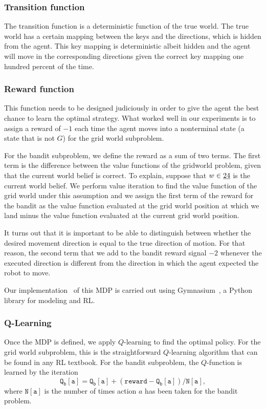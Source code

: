 \subsubsection{Transition function}
%
The transition function is a deterministic function of the true world. The true 
world has a certain mapping between the keys and the directions, which is hidden
from the agent. This key mapping is deterministic albeit hidden and the agent
will move in the corresponding directions given the correct key mapping one
hundred percent of the time.

\subsubsection{Reward function}
\label{sssec:reward}
%
This function needs to be designed judiciously in order to give the agent the
best chance to learn the optimal strategy. What worked well in our experiments
is to assign a reward of $-1$ each time the agent moves into a nonterminal state
(a state that is not $G$) for the grid world subproblem. 

For the bandit subproblem, we define the reward as a sum of two terms. The first
term is the difference between the value functions of the gridworld problem,
given that the current world belief is correct. To explain, suppose that $w \in
\uline{24}$ is the current world belief. We perform value iteration to find the
value function of the grid world under this assumption and we assign the first
term of the reward for the bandit as the value function evaluated at the grid
world position at which we land minus the value function evaluated at the
current grid world position.

It turns out that it is important to be able to distinguish between whether the 
desired movement direction is equal to the true direction of motion. For that 
reason, the second term that we add to the bandit reward signal $-2$ whenever
the executed direction is different from the direction in which the agent
expected the robot to move.

Our implementation~\cite{saticiGitHub} of this MDP is carried out using 
Gymnasium~\cite{towers2024gymnasium}, a Python library for modeling and RL.


\subsubsection{Q-Learning}

Once the MDP is defined, we apply $Q$-learning to find the optimal policy. For 
the grid world subproblem, this is the straightforward $Q$-learning algorithm 
that can be found in any RL textbook. For the bandit subproblem, the $Q$-function is learned by the iteration
%
\[
\mathtt{
Q_b[a] = Q_b[a] + (reward - Q_b[a]) / N[a],
}
\]
%
where $\mathtt{N[a]}$ is the number of times action $a$ has been taken for the 
bandit problem.

